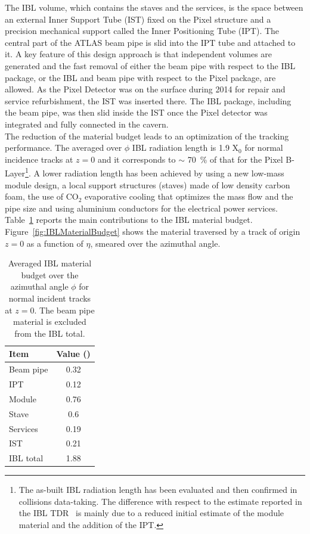 The IBL volume, which contains  the staves and the services, is the space between an external Inner Support Tube (IST) fixed on the Pixel structure and a precision mechanical support called the Inner Positioning Tube (IPT). The central part of the ATLAS beam pipe is slid into the IPT tube and attached to it.
A key feature of this design approach is that independent volumes are generated and the fast removal of either the beam pipe with respect to the IBL package, or the IBL and beam pipe with respect to the Pixel package, are allowed. 
As the Pixel Detector was on the surface during 2014 for repair and service refurbishment, the IST was inserted there.
The IBL package, including the beam pipe, was then slid inside the IST once the Pixel detector was integrated and fully connected in the cavern.\\
The reduction of the material budget leads to an optimization of the tracking performance.
The averaged over $\phi$ IBL radiation length is 1.9 X$_0$ for normal incidence tracks  at $z = 0$ and it corresponds to $\sim$ \SI{70}{\percent}  of that for the Pixel B-Layer\footnote{The as-built IBL radiation length has been evaluated and then confirmed  in collisions data-taking. The difference with respect to the estimate reported in the IBL TDR~\cite{Capeans:1291633} is mainly due to a reduced initial estimate of the module material and the addition of the IPT.}. 
A lower radiation length has been achieved by using a new low-mass module design, a local support structures (staves) made of low density carbon foam, the use of CO$_2$ evaporative cooling that optimizes the mass flow and the pipe size and using aluminium conductors for the electrical power services. Table~\ref{tab:MaterialBudget} reports the main contributions to the IBL material budget. Figure~\ref{fig:IBLMaterialBudget} shows the
 material traversed by a track of origin $z = 0$ as a function of $\eta$, smeared over the 
 azimuthal angle.


\begin{table}
	\centering
	\begin{tabular}{lc}
	\hline \hline
	Item & Value (\SI{}{\xzero})\\
	\hline
	Beam pipe & 0.32 \\
	IPT & 0.12 \\
	Module &  0.76 \\
	Stave   &  0.6 \\
	Services   & 0.19  \\
	IST   &  0.21 \\
	\hline
	 IBL total   & 1.88 \\
	\hline \hline
	\end{tabular}
	\caption{Averaged IBL material budget over the azimuthal angle $\phi$ for normal incident tracks  at $z = 0$.  The beam pipe material is excluded from the IBL total. 
	\label{tab:MaterialBudget}}
\end{table}




